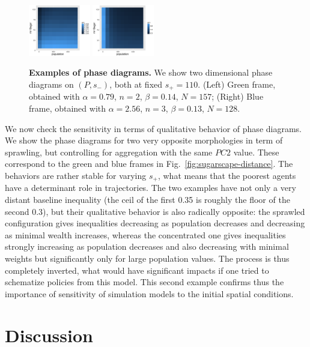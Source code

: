 \documentclass[Afour,sageh,times]{sagej}
\begin{document}
\begin{figure}
\centering
\includegraphics[width=0.24\textwidth]{figures/phasediagram_id27_maxSugar110}
\includegraphics[width=0.24\textwidth]{figures/phasediagram_id0_maxSugar110}
\caption{\textbf{Examples of phase diagrams.} We show two dimensional phase diagrams on $(P,s_-)$, both at fixed $s_+ = 110$. (Left) Green frame, obtained with $\alpha = 0.79$, $n=2$, $\beta = 0.14$, $N=157$; (Right) Blue frame, obtained with $\alpha = 2.56$, $n=3$, $\beta = 0.13$, $N=128$.}
\label{fig:sugarscape-phasediagrams}
\end{figure}

We now check the sensitivity in terms of qualitative behavior of phase diagrams. We show the phase diagrams for two very opposite morphologies in term of sprawling, but controlling for aggregation with the same $PC2$ value. These correspond to the green and blue frames in Fig.~\ref{fig:sugarscape-distance}. The behaviors are rather stable for varying $s_+$, what means that the poorest agents have a determinant role in trajectories. The two examples have not only a very distant baseline inequality (the ceil of the first 0.35 is roughly the floor of the second 0.3), but their qualitative behavior is also radically opposite: the sprawled configuration gives inequalities decreasing as population decreases and decreasing as minimal wealth increases, whereas the concentrated one gives inequalities strongly increasing as population decreases and also decreasing with minimal weights but significantly only for large population values. The process is thus completely inverted, what would have significant impacts if one tried to schematize policies from this model. This second example confirms thus the importance of sensitivity of simulation models to the initial spatial conditions.

\section{Discussion}
\end{document}
